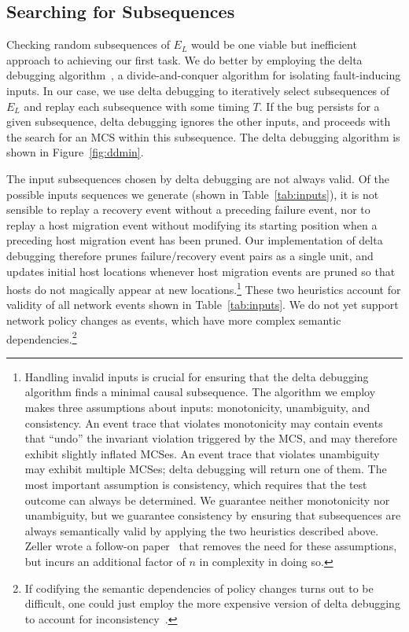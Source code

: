\subsection{Searching for Subsequences}
\label{subsec:delta_debugging}

Checking random subsequences of $E_L$ would be one viable but inefficient
approach to achieving our first task. We do better by employing
the delta debugging algorithm~\cite{Zeller:1999:YMP:318773.318946}, a
divide-and-conquer algorithm for
isolating fault-inducing inputs. In our case, we use delta
debugging to iteratively select subsequences of $E_L$ and replay each
subsequence with some timing $T$. If the bug persists for a given subsequence, delta debugging ignores the
other inputs, and proceeds with the search for an MCS within this subsequence.
The delta debugging algorithm is shown in Figure~\ref{fig:ddmin}.

The input subsequences chosen by delta debugging are not always
valid. Of the possible inputs sequences we generate (shown in
Table~\ref{tab:inputs}), it is not sensible to replay a recovery event without a
preceding failure event, nor to replay a host migration
event without modifying its starting position when a preceding host
migration event has been pruned. Our implementation of delta debugging
therefore prunes failure/recovery event pairs as a single unit, and updates initial host locations
whenever host migration events are pruned so that hosts do not magically appear at new
locations.\footnote{Handling invalid inputs is crucial for
ensuring that the delta debugging algorithm finds a minimal causal
subsequence. The algorithm we employ~\cite{Zeller:1999:YMP:318773.318946}
makes three
assumptions about inputs: monotonicity, unambiguity, and consistency.
An event trace that violates monotonicity may contain events that ``undo'' the
invariant violation triggered by the MCS, and may therefore exhibit slightly
inflated MCSes. An event trace that violates unambiguity may exhibit multiple MCSes; delta debugging
will return one of them. The most important assumption is consistency, which
requires that the test outcome can always be determined.
We guarantee neither monotonicity nor unambiguity, but we guarantee consistency by
ensuring that subsequences are always semantically valid by applying the two
heuristics described above. Zeller wrote a follow-on
paper~\cite{Zeller:2002:SIF:506201.506206} that removes the need for these
assumptions, but incurs an additional factor of $n$ in complexity in doing so.}
These two heuristics account for validity of all network
events shown in Table~\ref{tab:inputs}. We do not yet
support network policy changes as events, which have more complex semantic
dependencies.\footnote{If codifying the semantic dependencies of
policy changes turns out to be difficult, one could just employ the more
expensive version of delta debugging to account for
inconsistency~\cite{Zeller:2002:SIF:506201.506206}.}

